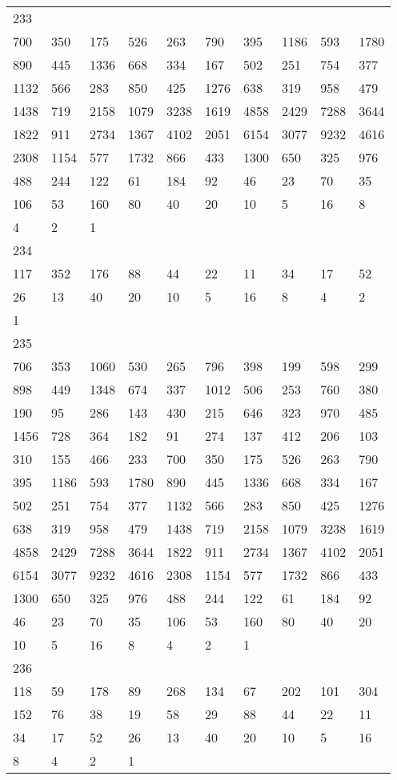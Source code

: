 \begin{longtable}{*{10}{l}}
233&&&&&&&&&\\
700& 350& 175& 526& 263& 790& 395& 1186& 593& 1780\\
890& 445& 1336& 668& 334& 167& 502& 251& 754& 377\\
1132& 566& 283& 850& 425& 1276& 638& 319& 958& 479\\
1438& 719& 2158& 1079& 3238& 1619& 4858& 2429& 7288& 3644\\
1822& 911& 2734& 1367& 4102& 2051& 6154& 3077& 9232& 4616\\
2308& 1154& 577& 1732& 866& 433& 1300& 650& 325& 976\\
488& 244& 122& 61& 184& 92& 46& 23& 70& 35\\
106& 53& 160& 80& 40& 20& 10& 5& 16& 8\\
4& 2& 1& \\

234&&&&&&&&&\\
117& 352& 176& 88& 44& 22& 11& 34& 17& 52\\
26& 13& 40& 20& 10& 5& 16& 8& 4& 2\\
1& \\

235&&&&&&&&&\\
706& 353& 1060& 530& 265& 796& 398& 199& 598& 299\\
898& 449& 1348& 674& 337& 1012& 506& 253& 760& 380\\
190& 95& 286& 143& 430& 215& 646& 323& 970& 485\\
1456& 728& 364& 182& 91& 274& 137& 412& 206& 103\\
310& 155& 466& 233& 700& 350& 175& 526& 263& 790\\
395& 1186& 593& 1780& 890& 445& 1336& 668& 334& 167\\
502& 251& 754& 377& 1132& 566& 283& 850& 425& 1276\\
638& 319& 958& 479& 1438& 719& 2158& 1079& 3238& 1619\\
4858& 2429& 7288& 3644& 1822& 911& 2734& 1367& 4102& 2051\\
6154& 3077& 9232& 4616& 2308& 1154& 577& 1732& 866& 433\\
1300& 650& 325& 976& 488& 244& 122& 61& 184& 92\\
46& 23& 70& 35& 106& 53& 160& 80& 40& 20\\
10& 5& 16& 8& 4& 2& 1& \\

236&&&&&&&&&\\
118& 59& 178& 89& 268& 134& 67& 202& 101& 304\\
152& 76& 38& 19& 58& 29& 88& 44& 22& 11\\
34& 17& 52& 26& 13& 40& 20& 10& 5& 16\\
8& 4& 2& 1& \\


\end{longtable}
